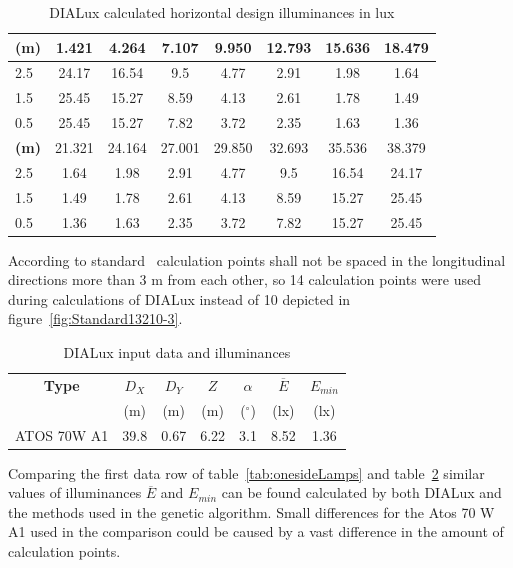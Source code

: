 \begin{table}[htb]
	\renewcommand{\arraystretch}{1.3}
	\caption{DIALux calculated horizontal design illuminances in lux}
 	\label{tab:DialuxOneSideLamps}
	\centering
  \begin{tabular}{ l || c | c | c | c | c | c | c }
    \hline
    \textbf{(m)} & 1.421 & 4.264 & 7.107 & 9.950 & 12.793 & 15.636 & 18.479\\ \hline \hline
    2.5 & 24.17 & 16.54 & 9.5 & 4.77 & 2.91 & 1.98 & 1.64\\ \hline
		1.5 & 25.45 & 15.27 & 8.59 & 4.13 & 2.61 & 1.78 & 1.49\\ \hline
		0.5 & 25.45 & 15.27 & 7.82 & 3.72 & 2.35 & 1.63 & 1.36\\ \hline \hline \hline
		\textbf{(m)} & 21.321 & 24.164 & 27.001 & 29.850 & 32.693 & 35.536 & 38.379\\ \hline \hline
		2.5 & 1.64 & 1.98 & 2.91 & 4.77 & 9.5 & 16.54 & 24.17\\ \hline
		1.5 & 1.49 & 1.78 & 2.61 & 4.13 & 8.59 & 15.27 & 25.45\\ \hline
		0.5 & 1.36 & 1.63 & 2.35 & 3.72 & 7.82 & 15.27 & 25.45\\ \hline
  \end{tabular}
\end{table}

According to standard~\cite{CSN_EN_13201-3} calculation points shall not be spaced in the longitudinal directions more than 3 m from each other, so 14 calculation points were used during calculations of DIALux instead of 10 depicted in figure~\ref{fig:Standard13210-3}.

\begin{table}[htb]
	\renewcommand{\arraystretch}{1.3}
	\caption{DIALux input data and illuminances}
 	\label{tab:DialuxIlluminances}
	\centering
  \begin{tabular}{ c | c | c | c | c | c | c }
    \hline
    \textbf{Type} & $D_X$ & $D_Y$ & $Z$ & $\alpha$ & $\overline{E}$ & $E_{min}$\\
		& (m) & (m) & (m) & ($^\circ$) & (lx) & (lx)\\ \hline
    ATOS 70W A1 & 39.8 & 0.67 & 6.22 & 3.1 & 8.52 & 1.36\\ \hline
  \end{tabular}
\end{table}

Comparing the first data row of table~\ref{tab:onesideLamps} and table~\ref{tab:DialuxIlluminances} similar values of illuminances $\overline{E}$ and $E_{min}$ can be found calculated by both DIALux and the methods used in the genetic algorithm. Small differences for the Atos 70 W A1 used in the comparison could be caused by a vast difference in the amount of calculation points.

